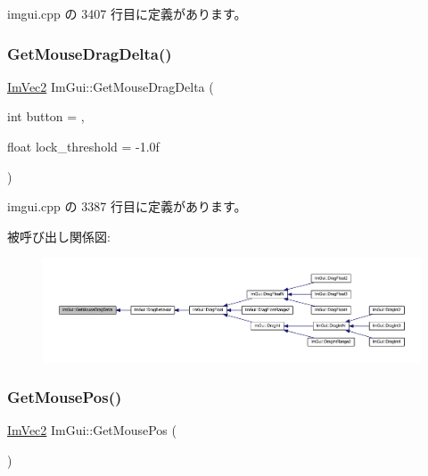  imgui.\+cpp の 3407 行目に定義があります。

\mbox{\label{namespace_im_gui_a94b8aecab8a4128145fea1ad7d381197}} 
\subsubsection{\texorpdfstring{Get\+Mouse\+Drag\+Delta()}{GetMouseDragDelta()}}
{\footnotesize\ttfamily \mbox{\hyperlink{struct_im_vec2}{Im\+Vec2}} Im\+Gui\+::\+Get\+Mouse\+Drag\+Delta (\begin{DoxyParamCaption}\item[{int}]{button = {},  }\item[{float}]{lock\+\_\+threshold = {\ttfamily -\/1.0f} }\end{DoxyParamCaption})}



 imgui.\+cpp の 3387 行目に定義があります。

被呼び出し関係図\+:\nopagebreak
\begin{figure}[H]
\begin{center}
\leavevmode
\includegraphics[width=350pt]{namespace_im_gui_a94b8aecab8a4128145fea1ad7d381197_icgraph}
\end{center}
\end{figure}
\mbox{\label{namespace_im_gui_abf11873349874c5d302861583c00d451}} 
\subsubsection{\texorpdfstring{Get\+Mouse\+Pos()}{GetMousePos()}}
{\footnotesize\ttfamily \mbox{\hyperlink{struct_im_vec2}{Im\+Vec2}} Im\+Gui\+::\+Get\+Mouse\+Pos (\begin{DoxyParamCaption}{ }\end{DoxyParamCaption})}



